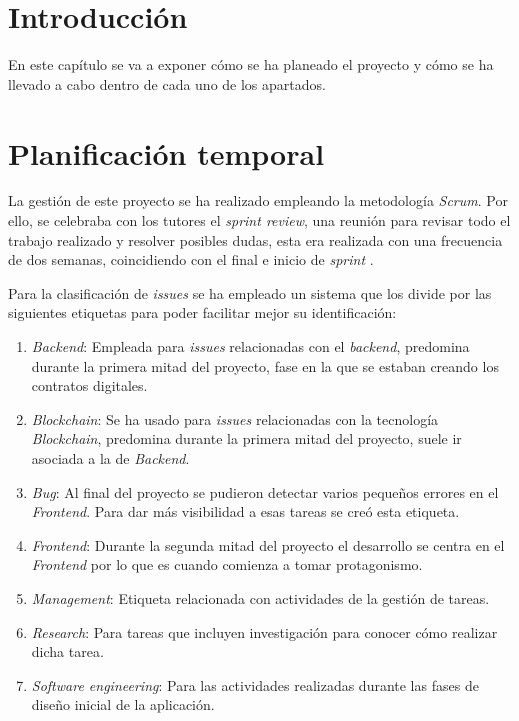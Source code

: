 
\section{Introducción}

En este capítulo se va a exponer cómo se ha planeado el proyecto y cómo se ha llevado a cabo dentro de cada uno de los apartados.

\section{Planificación temporal}
La gestión de este proyecto se ha realizado empleando la metodología \textit{Scrum}. Por ello, se celebraba con los tutores el \textit{sprint review}, una reunión para revisar todo el trabajo realizado y resolver posibles dudas, esta era realizada con una frecuencia de dos semanas, coincidiendo con el final e inicio de \textit{sprint} .

Para la clasificación de \textit{issues} se ha empleado un sistema que los divide por las siguientes etiquetas para poder facilitar mejor su identificación:
\begin{enumerate}
    \item \textit{Backend}: Empleada para \textit{issues} relacionadas con el \textit{backend}, predomina durante la primera mitad del proyecto, fase en la que se estaban creando los contratos digitales.
    \item \textit{Blockchain}: Se ha usado para \textit{issues} relacionadas con la tecnología \textit{Blockchain}, predomina durante la primera mitad del proyecto, suele ir asociada a la de \textit{Backend}.
    \item \textit{Bug}: Al final del proyecto se pudieron detectar varios pequeños errores en el \textit{Frontend}. Para dar más visibilidad a esas tareas se creó esta etiqueta.
    \item \textit{Frontend}: Durante la segunda mitad del proyecto el desarrollo se centra en el \textit{Frontend} por lo que es cuando comienza a tomar protagonismo.
    \item \textit{Management}: Etiqueta relacionada con actividades de la gestión de tareas.
    \item \textit{Research}: Para tareas que incluyen investigación para conocer cómo realizar dicha tarea.
    \item \textit{Software engineering}: Para las actividades realizadas durante las fases de diseño inicial de la aplicación.
\end{enumerate}

